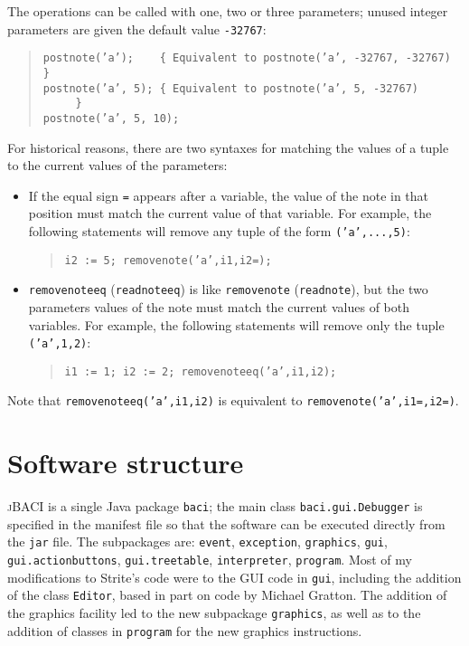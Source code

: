 \documentclass[11pt]{article}
\newcommand{\jb}{\textsc{\sffamily jBACI}}
\newcommand{\p}[1]{\texttt{#1}}
\begin{document}
The operations can be called with one, two or three parameters;
unused integer parameters are given the default value \p{-32767}:
\begin{quote}
\p{postnote('a');\ \ \ \ \{ Equivalent to postnote('a', -32767, -32767) \} }\\
\p{postnote('a', 5); \{ Equivalent to postnote('a', 5, -32767) \ \ \ \ \ \} }\\
\p{postnote('a', 5, 10);}
\end{quote}

For historical reasons, there are two syntaxes for matching the values of
a tuple to the current values of the parameters:
\begin{itemize}
\item If the equal sign \p{=} appears after a variable,
the value of the note in that position must match the current value of that variable.
For example, the following statements will remove any tuple
of the form \p{('a',...,5)}:
\begin{quote}
\p{i2 := 5; removenote('a',i1,i2=);}
\end{quote}
\item \p{removenoteeq} (\p{readnoteeq}) is like \p{removenote} (\p{readnote}),
but the two parameters values of the note must match the current
values of both variables.
For example, the following statements will remove only the tuple \p{('a',1,2)}:
\begin{quote}
\p{i1 := 1; i2 := 2; removenoteeq('a',i1,i2);}
\end{quote}
\end{itemize}
Note that \p{removenoteeq('a',i1,i2)} is equivalent to
\p{removenote('a',i1=,i2=)}.

\newpage

\section{Software structure}

\jb{} is a single Java package \p{baci};
the main class \p{baci.\-gui.\-Debugger} is specified in the manifest file
so that the software can be executed directly from the \p{jar} file.
The subpackages are: \p{event}, \p{exception}, \p{graphics},
\p{gui}, \p{gui.\-actionbuttons},
\p{gui.\-treetable}, \p{interpreter}, \p{program}.
Most of my modifications to Strite's code
were to the GUI code in \p{gui},
including the addition of the class \p{Editor},
based in part on code by Michael Gratton.
The addition of the graphics facility led to the new
subpackage \p{graphics},
as well as to the addition of classes
in \p{program} for the new graphics instructions.
\end{document}
